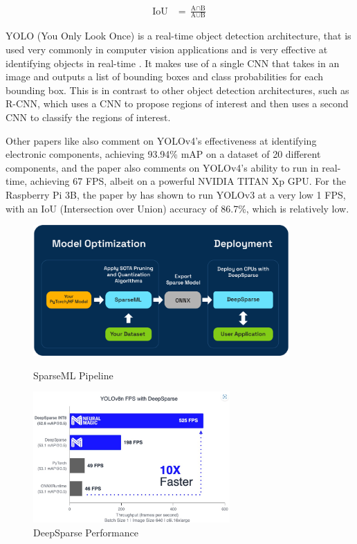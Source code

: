 {\fontsize{14pt}{11pt}\selectfont
\begin{align*}
    \text{IoU} &= \frac{\text{A} \cap \text{B}}{\text{A} \cup \text{B}} %
\end{align*}
}

YOLO (You Only Look Once) is a real-time object detection architecture, that is used very commonly in computer vision applications and is very effective at identifying objects in real-time \citet{yolo}. It makes use of a single CNN that takes in an image and outputs a list of bounding boxes and class probabilities for each bounding box. This is in contrast to other object detection architectures, such as R-CNN, which uses a CNN to propose regions of interest and then uses a second CNN to classify the regions of interest.

Other papers like \citet{Guo2021} also comment on YOLOv4's effectiveness at identifying electronic components, achieving 93.94\% mAP on a dataset of 20 different components, and the paper also comments on YOLOv4's ability to run in real-time, achieving 67 FPS, albeit on a powerful NVIDIA TITAN Xp GPU. For the Raspberry Pi 3B, the paper by \citet{9166199} has shown to run YOLOv3 at a very low 1 FPS, with an IoU (Intersection over Union) accuracy of 86.7\%, which is relatively low.

\begin{figure}[H]
  \begin{minipage}[t]{0.49\textwidth}
    \centering
    \includegraphics[width=\textwidth,height=5cm]{imgs/articles/sparseml-workflow.png}
    \caption{SparseML Pipeline \cite{sparseml}}
    \label{fig:sparseml}
  \end{minipage}
  \hfill
  \begin{minipage}[t]{0.49\textwidth}
      \centering
      \includegraphics[width=\textwidth,height=5cm]{imgs/articles/yoloperf.jpg}
      \caption{DeepSparse Performance \cite{neuralmagic}}
      \label{fig:deepsparse}
      \end{minipage}
\end{figure}

